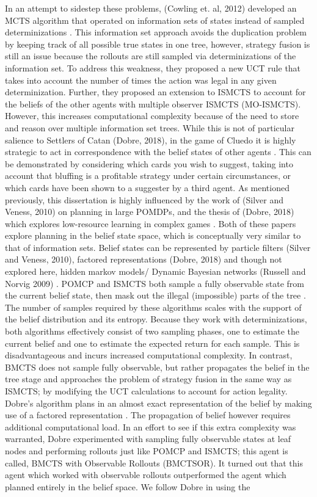 \documentclass[msc, deptreport, ai, romanprepages]{infthesis}
\begin{document}
In an attempt to sidestep these problems, (Cowling et. al, 2012) developed an MCTS algorithm that operated on information sets of states instead of sampled determinizations \cite{Cowling}. This information set approach avoids the duplication problem by keeping track of all possible true states in one tree, however, strategy fusion is still an issue because the rollouts are still sampled via determinizations of the information set. To address this weakness, they proposed a new UCT rule that takes into account the number of times the action was legal in any given determinization. Further, they proposed an extension to ISMCTS to account for the beliefs of the other agents with multiple observer ISMCTS (MO-ISMCTS). However, this increases computational complexity because of the need to store and reason over multiple information set trees. While this is not of particular salience to Settlers of Catan (Dobre, 2018), in the game of Cluedo it is highly strategic to act in correspondence with the belief states of other agents \cite{Mihai}. This can be demonstrated by considering which cards you wish to suggest, taking into account that bluffing is a profitable strategy under certain circumstances, or which cards have been shown to a suggester by a third agent. As mentioned previously, this dissertation is highly influenced by the work of (Silver and Veness, 2010) on planning in large POMDPs, and the thesis of (Dobre, 2018) which explores low-resource learning in complex games \cite{Silver-veness} \cite{Mihai}. Both of these papers explore planning in the belief state space, which is conceptually very similar to that of information sets. Belief states can be represented by particle filters (Silver and Veness, 2010), factored representations (Dobre, 2018) and though not explored here, hidden markov models/ Dynamic Bayesian networks (Russell and Norvig 2009) \cite{Silver-veness} \cite{Mihai} \cite{Russell-norvig}. POMCP and ISMCTS both sample a fully observable state from the current belief state, then mask out the illegal (impossible) parts of the tree \cite{Mihai}. The number of samples required by these algorithms scales with the support of the belief distribution and its entropy. Because they work with determinizations, both algorithms effectively consist of two sampling phases, one to estimate the current belief and one to estimate the expected return for each sample. This is disadvantageous and incurs increased computational complexity. In contrast, BMCTS does not sample fully observable, but rather propagates the belief in the tree stage and approaches the problem of strategy fusion in the same way as ISMCTS; by modifying the UCT calculations to account for action legality. Dobre’s algorithm plans in an almost exact representation of the belief by making use of a factored representation \cite{Mihai}. The propagation of belief however requires additional computational load. In an effort to see if this extra complexity was warranted, Dobre experimented with sampling fully observable states at leaf nodes and performing rollouts just like POMCP and ISMCTS; this agent is called, BMCTS with Observable Rollouts (BMCTSOR). It turned out that this agent which worked with observable rollouts outperformed the agent which planned entirely in the belief space. We follow Dobre in using the 
\end{document}
